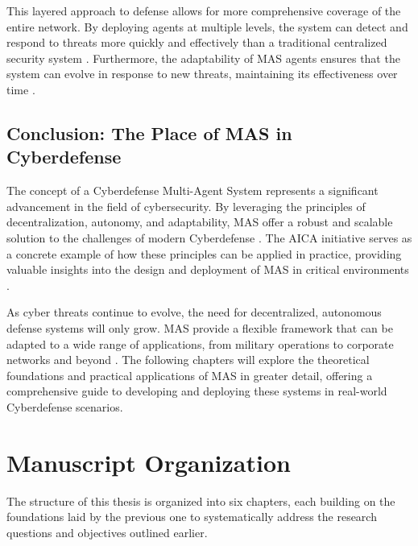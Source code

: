 This layered approach to defense allows for more comprehensive coverage of the entire network. By deploying agents at multiple levels, the system can detect and respond to threats more quickly and effectively than a traditional centralized security system \cite{bou-harb2017cyber}. Furthermore, the adaptability of MAS agents ensures that the system can evolve in response to new threats, maintaining its effectiveness over time \cite{haider2020artificial}.

\subsection{Conclusion: The Place of MAS in Cyberdefense}

The concept of a Cyberdefense Multi-Agent System represents a significant advancement in the field of cybersecurity. By leveraging the principles of decentralization, autonomy, and adaptability, MAS offer a robust and scalable solution to the challenges of modern Cyberdefense \cite{kolias2011swarm}. The AICA initiative serves as a concrete example of how these principles can be applied in practice, providing valuable insights into the design and deployment of MAS in critical environments \cite{bou-harb2014cyber}.

As cyber threats continue to evolve, the need for decentralized, autonomous defense systems will only grow. MAS provide a flexible framework that can be adapted to a wide range of applications, from military operations to corporate networks and beyond \cite{jahanbin2013computer}. The following chapters will explore the theoretical foundations and practical applications of MAS in greater detail, offering a comprehensive guide to developing and deploying these systems in real-world Cyberdefense scenarios.



\section{Manuscript Organization}

The structure of this thesis is organized into six chapters, each building on the foundations laid by the previous one to systematically address the research questions and objectives outlined earlier.


